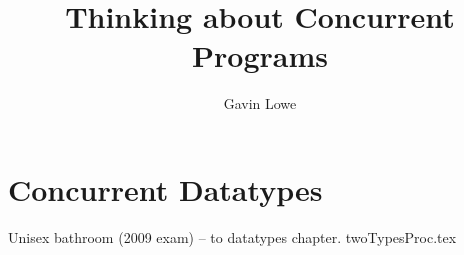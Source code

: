 \documentclass[12pt,a4paper]{book}
\title{Thinking about Concurrent Programs}
\author{Gavin Lowe}
\def\ignore#1{}
\begin{document}
\maketitle
{}
\cleardoublepage
\tableofcontents


\newpage
{}
\newpage

\ignore{




}
\chapter{Concurrent Datatypes}
\label{chap:datatypes}
%
Unisex bathroom (2009 exam) -- to datatypes chapter.  twoTypesProc.tex




\appendix

\ignore{


}



\end{document}
